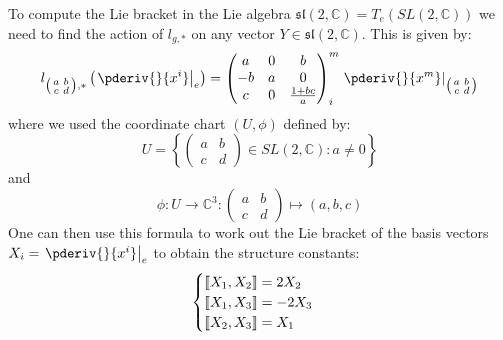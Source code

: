         \begin{example}[$SL(2, \mathbb{C})$]
        	To compute the Lie bracket in the Lie algebra $\mathfrak{sl}(2, \mathbb{C}) = T_e(SL(2, \mathbb{C}))$ we need to find the action of $l_{g, *}$ on any vector $Y\in\mathfrak{sl}(2, \mathbb{C})$. This is given by:
        	\begin{equation}
        		l_{\left(\begin{smallmatrix}a&b\\c&d\end{smallmatrix}\right), *}\left(\left.\pderiv{}{x^i}\right|_e\right)
        		= \left(\begin{matrix}a&0&b\\-b&a&0\\c&0&\frac{1+bc}{a}\end{matrix}\right)^m_i\left.\pderiv{}{x^m}\right|_{\left(\begin{smallmatrix}a&b\\c&d\end{smallmatrix}\right)}
        	\end{equation}
        	where we used the coordinate chart $(U, \phi)$ defined by: \[U = \left\{\left(\begin{matrix}a&b\\c&d\end{matrix}\right)\in SL(2, \mathbb{C}): a\neq0\right\}\] and \[\phi:U\rightarrow\mathbb{C}^3:\left(\begin{matrix}a&b\\c&d\end{matrix}\right)\mapsto(a, b, c)\]
        	One can then use this formula to work out the Lie bracket of the basis vectors $X_i = \left.\pderiv{}{x^i}\right|_e$ to obtain the structure constants:
        	\begin{equation}
        		\label{lie:sl2c_lie_brackets}
        		\begin{cases}
        			\text{\textlbrackdbl}X_1, X_2\text{\textrbrackdbl} = 2X_2\\
        			\text{\textlbrackdbl}X_1, X_3\text{\textrbrackdbl} = -2X_3\\
        			\text{\textlbrackdbl}X_2, X_3\text{\textrbrackdbl} = X_1
        		\end{cases}
        	\end{equation}
        \end{example}

